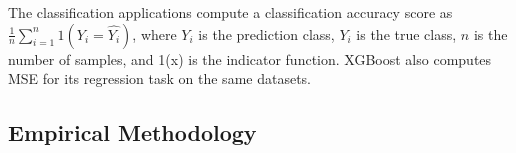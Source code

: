 The classification applications compute a classification accuracy score
as $\frac{1}{n}\sum_{i=1}^{n}1(Y_i = \hat{Y_i})$, where $Y_i$ is the
prediction class, $Y_i$ is the true class, $n$ is the number of samples, and 1(x)
is the indicator function. XGBoost also computes MSE for its regression task
on the same datasets. 







\subsection{Empirical Methodology}


